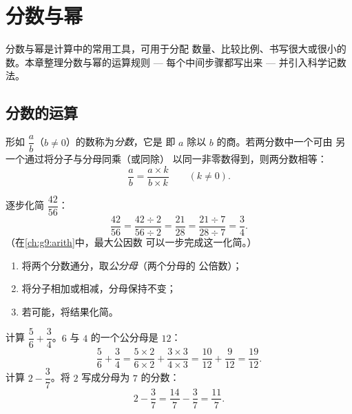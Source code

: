 \chapter{分数与幂}\label{ch:g9:fractions}

分数与幂是计算中的常用工具，可用于分配
数量、比较比例、书写很大或很小的
数。本章整理分数与幂的运算规则 ---
每个中间步骤都写出来 ---
并引入科学记数法。

\section{分数的运算}

\begin{definition}[分数]\label{def:g9:fractions:fraction}
形如 $\dfrac ab$（$b \neq 0$）的数称为\emph{分数}，它是
即 $a$ 除以 $b$ 的商。若两分数中一个可由
另一个通过将分子与分母同乘（或同除）
以同一非零数得到，则两分数相等：
\[
\frac ab = \frac{a \times k}{b \times k} \qquad (k \neq 0).
\]
\end{definition}

\begin{example}\label{ex:g9:fractions:simplify}
逐步化简 $\dfrac{42}{56}$：
\[
\frac{42}{56} = \frac{42 \div 2}{56 \div 2} = \frac{21}{28}
= \frac{21 \div 7}{28 \div 7} = \frac34 .
\]
（在\cref{ch:g9:arith}中，最大公因数
可以一步完成这一化简。）
\end{example}

\begin{method}[分数的加减法]\label{met:g9:fractions:add}
\begin{enumerate}
  \item 将两个分数通分，取\emph{公分母}（两个分母的
        公倍数）；
  \item 将分子相加或相减，分母保持不变；
  \item 若可能，将结果化简。
\end{enumerate}
\end{method}

\begin{example}\label{ex:g9:fractions:add}
计算 $\dfrac56 + \dfrac34$。$6$ 与 $4$ 的一个公分母是
$12$：
\[
\frac56 + \frac34
= \frac{5 \times 2}{6 \times 2} + \frac{3 \times 3}{4 \times 3}
= \frac{10}{12} + \frac{9}{12}
= \frac{19}{12}.
\]
计算 $2 - \dfrac37$。将 $2$ 写成分母为 $7$ 的分数：
\[
2 - \frac37 = \frac{14}{7} - \frac37 = \frac{11}{7}.
\]
\end{example}

